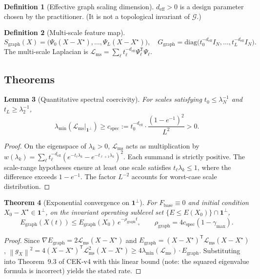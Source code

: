 \documentclass[11pt,a4paper]{article}
\newtheorem{theorem}{Theorem}[section]
\newtheorem{lemma}[theorem]{Lemma}
\theoremstyle{definition}
\newtheorem{definition}[theorem]{Definition}
\newcommand{\Fbase}{F_{\mathrm{base}}}
\newcommand{\T}{^{\mathsf{T}}}
\newcommand{\norm}[1]{\left\|#1\right\|}
\newcommand{\diag}{\mathrm{diag}}
\newcommand{\eff}{\mathrm{eff}}
\newcommand{\graph}{\mathrm{graph}}
\newcommand{\ms}{\mathrm{ms}}
\newcommand{\spec}{\mathrm{spec}}
\begin{document}
\begin{definition}[Effective graph scaling dimension]
$d_{\eff} > 0$ is a design parameter chosen by the practitioner. (It is not a topological invariant of $\mathcal{G}$.)
\end{definition}

\begin{definition}[Multi-scale feature map]
\[
S_\graph(X) = \big(\Psi_0(X - X^\star),\dots,\Psi_L(X-X^\star)\big), \quad
G_\graph = \diag\big(t_0^{-d_\eff} I_N,\dots,t_L^{-d_\eff} I_N\big).
\]
The multi-scale Laplacian is $\mathcal{L}_\ms = \sum_\ell t_\ell^{-d_\eff} \Psi_\ell\T \Psi_\ell$.
\end{definition}

\subsection{Theorems}

\begin{lemma}[Quantitative spectral coercivity]
\label{lem:dfl1}
For scales satisfying $t_0 \leq \lambda_N^{-1}$ and $t_L \geq \lambda_2^{-1}$,
\[
\lambda_{\min}(\mathcal{L}_\ms\big|_{\mathbf{1}^\perp}) \geq c_\spec := t_0^{-d_\eff} \cdot \frac{(1 - e^{-1})^2}{L^2} > 0.
\]
\end{lemma}

\begin{proof}
On the eigenspace of $\lambda_k > 0$, $\mathcal{L}_\ms$ acts as multiplication by $w(\lambda_k) = \sum_\ell t_\ell^{-d_\eff}(e^{-t_\ell \lambda_k} - e^{-t_{\ell+1}\lambda_k})^2$. Each summand is strictly positive. The scale-range hypotheses ensure at least one scale satisfies $t_\ell \lambda_k \leq 1$, where the difference exceeds $1 - e^{-1}$. The factor $L^{-2}$ accounts for worst-case scale distribution.
\end{proof}

\begin{theorem}[Exponential convergence on $\mathbf{1}^\perp$]
\label{thm:dfl2}
For $\Fbase \equiv 0$ and initial condition $X_0 - X^\star \in \mathbf{1}^\perp$, on the invariant operating sublevel set $\{E \leq E(X_0)\} \cap \mathbf{1}^\perp$,
\[
E_\graph(X(t)) \leq E_\graph(X_0)\,e^{-\rho_\graph t}, \qquad
\rho_\graph = 4 c_\spec (1 - \gamma_{\max}).
\]
\end{theorem}

\begin{proof}
Since $\nabla E_\graph = 2\mathcal{L}_\ms (X - X^\star)$ and $E_\graph = (X-X^\star)\T \mathcal{L}_\ms (X-X^\star)$,
$\norm{g_X}^2 = 4(X-X^\star)\T \mathcal{L}_\ms^2 (X-X^\star) \geq 4\lambda_{\min}(\mathcal{L}_\ms) \cdot E_\graph$.
Substituting into Theorem~9.3 of CEK-v4 with this linear bound (note: the squared eigenvalue formula is incorrect) yields the stated rate.
\end{proof}
\end{document}
